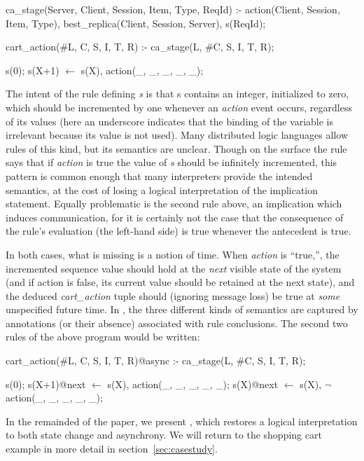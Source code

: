 \begin{Dedalus}
ca_stage(Server, Client, Session, Item, Type, ReqId) :-
  action(Client, Session, Item, Type),
  best_replica(Client, Session, Server),
  s(ReqId);

cart_action(#L, C, S, I, T, R) :-
  ca_stage(L, #C, S, I, T, R);

s(0);
s(X+1) \(\leftarrow\)  s(X), action(_, _, _, _, _);

\end{Dedalus}


The intent of the rule defining {\em s} is that s contains an integer, initialized to
zero, which should be incremented by one whenever an {\em action} event occurs,
regardless of its values (here an underscore indicates that the binding of the variable
is irrelevant because its value is not used).  
Many distributed logic languages allow rules of this kind,
but its semantics are unclear.  Though on the surface the rule says that if {\em action} is true
the value of {\em s} should be infinitely incremented, this pattern is common enough
that many interpreters provide the intended semantics, at the cost of losing a logical
interpretation of the implication statement.  Equally problematic is the second rule above,
an implication which induces communication, for it is certainly not the case that the consequence of the rule's evaluation (the left-hand side) is true whenever the antecedent is
true.  

In both cases, what is missing is a notion of time.  When {\em action} is ``true,'',
the incremented sequence value should
hold at the {\em next} visible state of the system (and if action is false, its current
value should be retained at the next state), and the deduced {\em cart\_action}
tuple should (ignoring message loss) be true at {\em some} unspecified future time.  In \lang,
the three different kinds of semantics are captured by annotations (or their absence) 
associated with rule conclusions.  The second two rules of the above program would be
written:

\begin{Dedalus}

cart_action(#L, C, S, I, T, R)@async :-
  ca_stage(L, #C, S, I, T, R);

s(0);
s(X+1)@next \(\leftarrow\)  s(X), action(_, _, _, _, _);
s(X)@next \(\leftarrow\)  s(X), \(\lnot\) action(_, _, _, _, _);

\end{Dedalus}


In the remainded of the paper, we present \lang, which restores a logical interpretation to
both state change and asynchrony.  We will return to the shopping cart example in more detail 
in section~\ref{sec:casestudy}.

